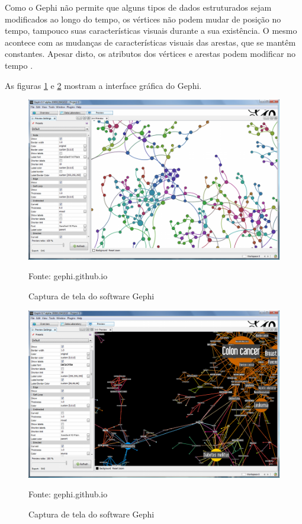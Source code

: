 Como o Gephi não permite que alguns tipos de dados estruturados sejam modificados ao longo do tempo,
os vértices não podem mudar de posição no tempo, tampouco suas características visuais durante a sua existência.
O mesmo acontece com as mudanças de características visuais das arestas, que se mantêm constantes. Apesar
disto, os atributos dos vértices e arestas podem modificar no tempo \cite{dynagraph}.

As figuras \ref{fig:gephiUm} e \ref{fig:gephiDois} mostram a interface gráfica do Gephi.

\FloatBarrier
\begin{figure}[htbp]
\centering
 \includegraphics[width=.85\textwidth]{chapters/fig/gephiUm.png}
\caption{Captura de tela do software Gephi}
Fonte: gephi.github.io
\label{fig:gephiUm}
\end{figure}

\begin{figure}[htbp]
\centering
 \includegraphics[width=.85\textwidth]{chapters/fig/gephiDois.png}
\caption{Captura de tela do software Gephi}
Fonte: gephi.github.io
\label{fig:gephiDois}
\end{figure}

